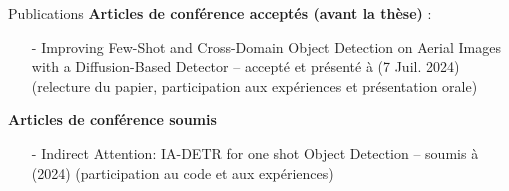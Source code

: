 \begin{subsectionframemod}{Publications}
    \textbf{Articles de conférence acceptés (avant la thèse)} :
    \begin{itemize}
        \item[-] Improving Few-Shot and Cross-Domain Object Detection on Aerial Images with a Diffusion-Based Detector --
        accepté et présenté à  (7 Juil. 2024) (relecture du papier, participation aux expériences et présentation orale)
    \end{itemize}

    \textbf{Articles de conférence soumis}
    \begin{itemize}
        \item[-] Indirect Attention: IA-DETR for one shot Object Detection -- soumis à  (2024) (participation au code et aux expériences)
    \end{itemize}

\end{subsectionframemod}

